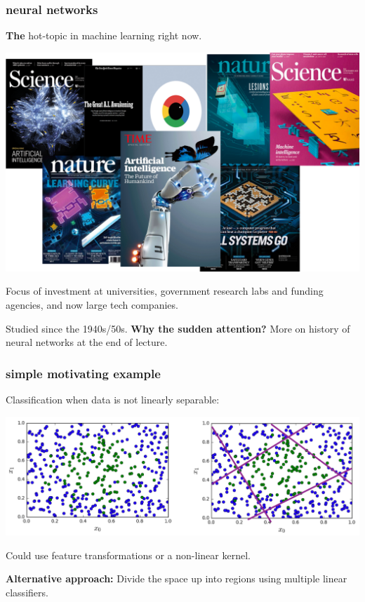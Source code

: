 \documentclass[handout,compress]{beamer}
\begin{document}
\begin{frame}
	\frametitle{neural networks}
	\begin{center}
	\alert{\textbf{The} hot-topic in machine learning right now.}
	
	\includegraphics[width=.6\textwidth]{hottopic.png}
	
	Focus of investment at universities, government research labs and funding agencies, and now large tech companies.
	\end{center}

	Studied since the 1940s/50s. \textbf{Why the sudden attention?} More on history of neural networks at the end of lecture. 	
\end{frame}

\begin{frame}
	\frametitle{simple motivating example}
	Classification when data is not linearly separable:
	\begin{center}
		\includegraphics[width=.9\textwidth]{nonsep_chop.png}
	\end{center}
	Could use feature transformations or a non-linear kernel. 
	
	\begin{center}
		\textbf{Alternative approach:} Divide the space up into regions using multiple linear classifiers.
	\end{center}
\end{frame}
\end{document}

